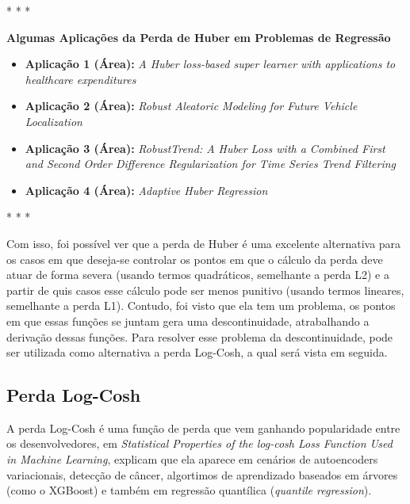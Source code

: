 \medskip
\begin{center}
 * * *
\end{center}
\medskip

\textbf{Algumas Aplicações da Perda de Huber em Problemas de Regressão} 
\vspace{1em}

\begin{itemize}
    \item \textbf{Aplicação 1 (Área):} \textit{A Huber loss-based super learner with applications to healthcare expenditures} \textcite{HuberLossSuperLearner}
    \item \textbf{Aplicação 2 (Área):} \textit{Robust Aleatoric Modeling for Future Vehicle Localization} \textcite{RobustAleatoricModelingVehicleLocalization}
    \item \textbf{Aplicação 3 (Área):} \textit{RobustTrend: A Huber Loss with a Combined First and Second Order Difference Regularization for Time Series Trend Filtering} 
    \item \textbf{Aplicação 4 (Área):} \textit{Adaptive Huber Regression} \textcite{AdaptiveHuberRegression}
\end{itemize}

\medskip
\begin{center}
 * * *
\end{center}
\medskip

Com isso, foi possível ver que a perda de Huber é uma excelente alternativa para os casos em que deseja-se controlar os pontos em que o cálculo da perda deve atuar de forma severa (usando termos quadráticos, semelhante a perda L2) e a partir de quis casos esse cálculo pode ser menos punitivo (usando termos lineares, semelhante a perda L1). Contudo, foi visto que ela tem um problema, os pontos em que essas funções se juntam gera uma descontinuidade, atrabalhando a derivação dessas funções. Para resolver esse problema da descontinuidade, pode ser utilizada como alternativa a perda Log-Cosh, a qual será vista em seguida.

\subsection{Perda Log-Cosh} 

A perda Log-Cosh é uma função de perda que vem ganhando popularidade entre os desenvolvedores, em \textit{Statistical Properties of the log-cosh Loss Function Used in Machine Learning}, \textcite{StatisticalPropetiesLogCosh} explicam que ela aparece em cenários de autoencoders variacionais, detecção de câncer, algortimos de aprendizado baseados em árvores (como o XGBoost) e também em regressão quantílica (\textit{quantile regression}).

